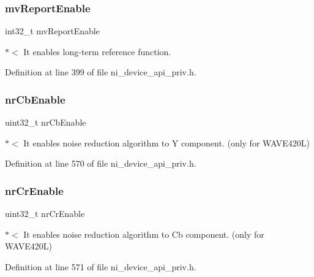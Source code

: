 \subsubsection{\texorpdfstring{mvReportEnable}{mvReportEnable}}
{\footnotesize\ttfamily int32\+\_\+t mv\+Report\+Enable}

$\ast$$<$ It enables long-\/term reference function. 

Definition at line 399 of file ni\+\_\+device\+\_\+api\+\_\+priv.\+h.

\mbox{\label{struct__ni__encoder__change__params__t_a556db0011f8c283748d38093092c1563}} 
\subsubsection{\texorpdfstring{nrCbEnable}{nrCbEnable}}
{\footnotesize\ttfamily uint32\+\_\+t nr\+Cb\+Enable}

$\ast$$<$ It enables noise reduction algorithm to Y component. (only for W\+A\+V\+E420L) 

Definition at line 570 of file ni\+\_\+device\+\_\+api\+\_\+priv.\+h.

\mbox{\label{struct__ni__encoder__change__params__t_acee109a61abe6ce43c63c7924e42b2da}} 
\subsubsection{\texorpdfstring{nrCrEnable}{nrCrEnable}}
{\footnotesize\ttfamily uint32\+\_\+t nr\+Cr\+Enable}

$\ast$$<$ It enables noise reduction algorithm to Cb component. (only for W\+A\+V\+E420L) 

Definition at line 571 of file ni\+\_\+device\+\_\+api\+\_\+priv.\+h.

\mbox{\label{struct__ni__encoder__change__params__t_a82fa586ef2b68c8095f8efac3de9980b}} 
